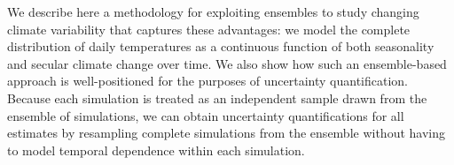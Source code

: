 \documentclass{ametsoc}
\begin{document}






We describe here a methodology for exploiting ensembles %
 to study changing climate variability 
that captures these advantages:  we model the complete distribution of daily temperatures as a continuous function of both seasonality and secular climate change over time. 
We also show how such an ensemble-based approach is well-positioned for the purposes of uncertainty quantification. Because each simulation is treated as an independent sample drawn from the ensemble of simulations, we can obtain uncertainty quantifications for all estimates by resampling complete simulations from the ensemble without having to model temporal dependence within each simulation.  
\end{document}
